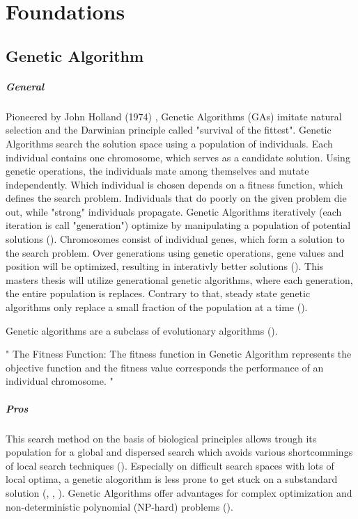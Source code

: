\chapter{Foundations}
\label{chap:foundation}

\section{Genetic Algorithm}
\label{chap:foundation:genetic_algorithm}


\paragraph{General}
Pioneered by John Holland (1974) , Genetic Algorithms (GAs) imitate natural selection and the Darwinian principle called "survival of the fittest". Genetic Algorithms search the solution space using a population of individuals. Each individual contains one chromosome, which serves as a candidate solution. Using genetic operations, the individuals mate among themselves and mutate independently. Which individual is chosen depends on a fitness function, which defines the search problem. Individuals that do poorly on the given problem die out, while "strong" individuals propagate.
Genetic Algorithms iteratively (each iteration is call "generation") optimize by manipulating a population of potential solutions (\cite{srinivas_genetic_1994}).
Chromosomes consist of individual genes, which form a solution to the search problem. Over generations using genetic operations, gene values and position will be optimized, resulting in interativly better solutions (\cite{srinivas_genetic_1994}).
This masters thesis will utilize generational genetic algorithms, where each generation, the entire population is replaces. Contrary to that, steady state genetic algorithms only replace a small fraction of the population at a time (\cite{srinivas_genetic_1994}).

Genetic algorithms are a subclass of evolutionary algorithms (\cite{mills_determining_2015}).


"
The Fitness Function: The fitness function in Genetic Algorithm represents the objective function and the fitness value corresponds the performance of an individual chromosome.
"\cite{majumdar_genetic_2015}

\paragraph{Pros}
This search method on the basis of biological principles allows trough its population for a global and dispersed search which avoids various shortcommings of local search techniques (\cite{grefenstette_optimization_1986}). Especially on difficult search spaces with lots of local optima, a genetic alogorithm is less prone to get stuck on a substandard solution (\cite{katoch_review_2021}, \cite{xia_genetic_2019}, \cite{majumdar_genetic_2015}). Genetic Algorithms offer advantages for complex optimization and non-deterministic polynomial (NP-hard) problems (\cite{hussain_trade-off_2020}).

